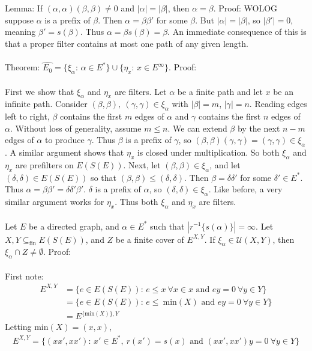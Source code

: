 \documentclass{article}
\begin{document}
Lemma: If $(\alpha, \alpha)(\beta, \beta) \neq 0$ and $|\alpha| = |\beta|$, then $\alpha = \beta$. Proof:
WOLOG suppose $\alpha$ is a prefix of $\beta$. Then $\alpha = \beta \beta'$ for some $\beta$. But
$|\alpha| = |\beta|$, so $|\beta'| = 0$, meaning $\beta' = s(\beta)$. Thus $\alpha = \beta s(\beta) = \beta$.
An immediate consequence of this is that a proper filter contains at most one path of any given length.
\\ \\
Theorem: $\hat{E_0} = \{\xi_\alpha\text{: } \alpha \in E^*\} \cup \{\eta_x\text{: } x \in E^\infty\}$. Proof:
\\ \\
First we show that $\xi_\alpha$ and $\eta_x$ are filters. Let $\alpha$ be a finite path and let $x$ be an infinite path.
Consider $(\beta, \beta), \ (\gamma, \gamma) \in \xi_\alpha$ with $|\beta| = m$, $|\gamma| = n$. 
Reading edges left to right, $\beta$ contains the first $m$ edges of $\alpha$ and $\gamma$ 
contains the first $n$ edges of $\alpha$. Without loss of generality, assume $m \leq n$. 
We can extend $\beta$ by the next $n - m$ edges of $\alpha$ to produce $\gamma$. Thus
$\beta$ is a prefix of $\gamma$, so $(\beta, \beta)(\gamma, \gamma) = (\gamma, \gamma) \in \xi_\alpha$.
A similar argument shows that $\eta_x$ is closed under multiplication. So both $\xi_\alpha$ and $\eta_x$ are prefilters
on $E(S(E))$. Next, let $(\beta, \beta) \in \xi_\alpha$, and let $(\delta, \delta) \in E(S(E))$ so that 
$(\beta, \beta) \leq (\delta, \delta)$. Then $\beta = \delta \delta'$ for some $\delta' \in E^*$. 
Thus $\alpha = \beta \beta' = \delta \delta' \beta'$. $\delta$ is a prefix of $\alpha$, so 
$(\delta, \delta) \in \xi_\alpha$. Like before, a very similar argument works for $\eta_x$. Thus both 
$\xi_\alpha$ and $\eta_x$ are filters.
\\ \\
Let $E$ be a directed graph, and $\alpha \in E^*$ such that $|r^{-1}\{s(\alpha)\}| = \infty$.
Let $X, Y \subseteq_{\text{fin}} E(S(E))$, and $Z$ be a finite cover of $E^{X, Y}$.
If $\xi_\alpha \in \mathcal{U}(X, Y)$, then $\xi_\alpha \cap Z \neq \emptyset$. Proof:
\\ \\
First note:
\begin{align*}
    E^{X, Y} &= \{ e \in E(S(E))\text{: } e \leq x \ \forall x \in x \text{ and } ey = 0 \ \forall y \in Y \} \\
             &= \{ e \in E(S(E))\text{: } e \leq \ \text{min}(X) \text{ and } ey = 0 \ \forall y \in Y \} \\
             &= E^{\{\text{min}(X)\}, Y}
\end{align*}
Letting min$(X) = (x, x)$,
\begin{align*}
    E^{X, Y} = \{ (xx', xx') \text{: } x' \in E^*, \ r(x') = s(x) \text{ and } (xx', xx')y = 0 \ \forall y \in Y \}
\end{align*}
\end{document}
